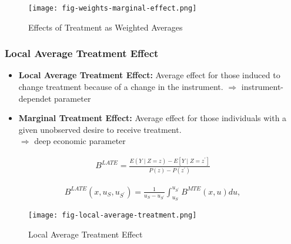 \begin{frame}

\begin{figure}[htp]\centering
	\caption{Effects of Treatment as Weighted Averages}\label{Effects of Treatment as Weighted Averages}\scalebox{0.35}
	{\texttt{[image: fig-weights-marginal-effect.png]}}
\end{figure}

\end{frame}


\begin{frame}
\frametitle{Local Average Treatment Effect}

\begin{itemize}
\item \textbf{Local Average Treatment Effect:} Average effect for those induced
to change treatment because of a change in the instrument.
\(\Rightarrow\) instrument-dependet parameter

\item \textbf{Marginal Treatment Effect:} Average effect for those individuals
with a given unobserved desire to receive treatment.\\
\(\Rightarrow\) deep economic parameter
\end{itemize}

    \begin{align*}
B^{LATE} = \frac{E(Y\mid Z = z) - E[Y \mid Z = z^\prime]}{P(z) - P(z^\prime)}
\end{align*}

\begin{align*}
B^{LATE}(x, u_S, u_{S^\prime}) = \frac{1}{u_S - u_{S^\prime}} \int_{u_S}^{u_{S^\prime}} B^{MTE}(x, u) du,
\end{align*}

\end{frame}


\begin{frame}

\begin{figure}[htp]\centering
	\caption{Local Average Treatment Effect}\label{Local Average Treatment}\scalebox{0.35}
	{\texttt{[image: fig-local-average-treatment.png]}}
\end{figure}

\end{frame}


